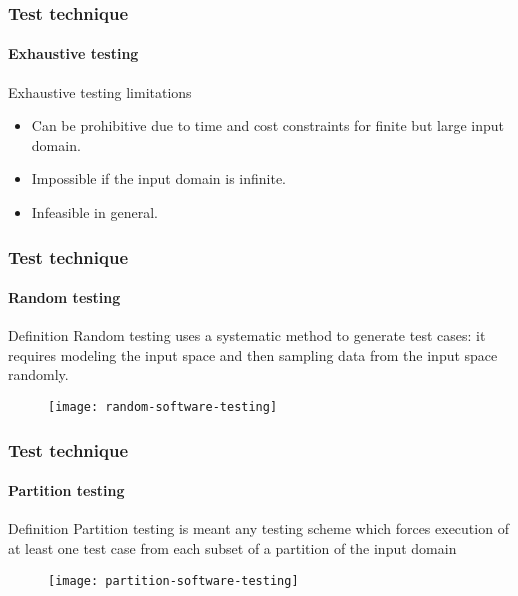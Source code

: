 \begin{frame}
\frametitle{Test technique}
\framesubtitle{Exhaustive testing}

\begin{block:fact}{Exhaustive testing limitations}
\begin{itemize}
	\item Can be prohibitive due to time and cost constraints for finite
	but large input domain.

	\item Impossible if the input domain is infinite.

	\item Infeasible in general.
\end{itemize}
\end{block:fact}
\end{frame}



\begin{frame}[imacidii]
\frametitle{Test technique}
\framesubtitle{Random testing}
\label{concept:random-testing}

\begin{block:concept}{Definition}
Random testing uses a systematic method to generate test cases: it
requires modeling the input space and then sampling data from the input
space randomly.
\end{block:concept}

\begin{figure}
    \centering
    \texttt{[image: random-software-testing]}
\end{figure}

\end{frame}



\begin{frame}[imacidii]
\frametitle{Test technique}
\framesubtitle{Partition testing}
\label{concept:partition-testing}

\begin{block:concept}{Definition}
Partition testing is meant any testing scheme which forces execution
of at least one test case from each subset of a partition of the input
domain
\end{block:concept}

\begin{figure}
    \centering
    \texttt{[image: partition-software-testing]}
\end{figure}
\end{frame}




